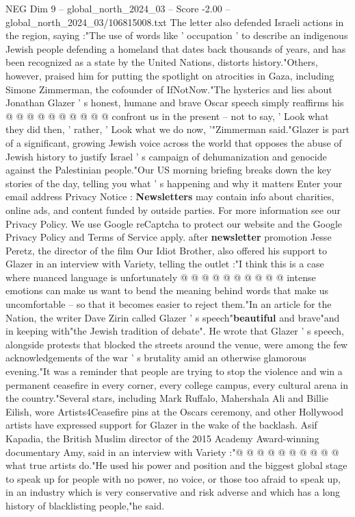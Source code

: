 \begin{textsample}{NEG Dim 9 – global\_north\_2024\_03 – Score -2.00 – global\_north\_2024\_03/106815008.txt}
The letter also defended Israeli actions in the region, saying :"The use of words like ' occupation ' to describe an indigenous Jewish people defending a homeland that dates back thousands of years, and has been recognized as a state by the United Nations, distorts history."Others, however, praised him for putting the spotlight on atrocities in Gaza, including Simone Zimmerman, the cofounder of IfNotNow."The hysterics and lies about Jonathan Glazer ' s honest, humane and brave Oscar speech simply reaffirms his @ @ @ @ @ @ @ @ @ @ confront us in the present -- not to say, ' Look what they did then, ' rather, ' Look what we do now, '"Zimmerman said."Glazer is part of a significant, growing Jewish voice across the world that opposes the abuse of Jewish history to justify Israel ' s campaign of dehumanization and genocide against the Palestinian people."Our US morning briefing breaks down the key stories of the day, telling you what ' s happening and why it matters Enter your email address Privacy Notice : \textbf{Newsletters} may contain info about charities, online ads, and content funded by outside parties.
For more information see our Privacy Policy.
We use Google reCaptcha to protect our website and the Google Privacy Policy and Terms of Service apply. after \textbf{newsletter} promotion Jesse Peretz, the director of the film Our Idiot Brother, also offered his support to Glazer in an interview with Variety, telling the outlet :"I think this is a case where nuanced language is unfortunately @ @ @ @ @ @ @ @ @ @ intense emotions can make us want to bend the meaning behind words that make us uncomfortable -- so that it becomes easier to reject them."In an article for the Nation, the writer Dave Zirin called Glazer ' s speech"\textbf{beautiful} and brave"and in keeping with"the Jewish tradition of debate".
He wrote that Glazer ' s speech, alongside protests that blocked the streets around the venue, were among the few acknowledgements of the war ' s brutality amid an otherwise glamorous evening."It was a reminder that people are trying to stop the violence and win a permanent ceasefire in every corner, every college campus, every cultural arena in the country."Several stars, including Mark Ruffalo, Mahershala Ali and Billie Eilish, wore Artists4Ceasefire pins at the Oscars ceremony, and other Hollywood artists have expressed support for Glazer in the wake of the backlash.
Asif Kapadia, the British Muslim director of the 2015 Academy Award-winning documentary Amy, said in an interview with Variety :"@ @ @ @ @ @ @ @ @ @ what true artists do."He used his power and position and the biggest global stage to speak up for people with no power, no voice, or those too afraid to speak up, in an industry which is very conservative and risk adverse and which has a long history of blacklisting people,"he said.

\end{textsample}

